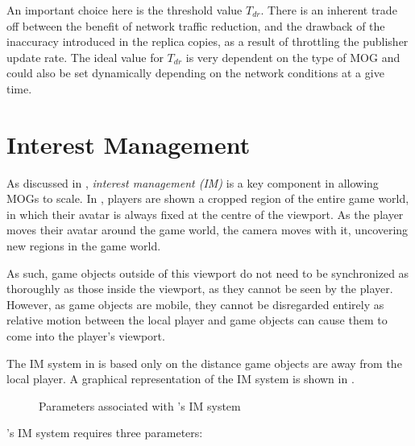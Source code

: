 An important choice here is the threshold value $T_{dr}$. There is an inherent trade off between the benefit of network traffic reduction, and the drawback of the inaccuracy introduced in the replica copies, as a result of throttling the publisher update rate. The ideal value for $T_{dr}$ is very dependent on the type of MOG and could also be set dynamically depending on the network conditions at a give time.


\section{Interest Management}\label{sec:des:im}
As discussed in , \textit{interest management (IM)} is a key component in allowing MOGs to scale. In \game{}, players are shown a cropped region of the entire game world, in which their avatar is always fixed at the centre of the viewport. As the player moves their avatar around the game world, the camera moves with it, uncovering new regions in the game world.

As such, game objects outside of this viewport do not need to be synchronized as thoroughly as those inside the viewport, as they cannot be seen by the player. However, as game objects are mobile, they cannot be disregarded entirely as relative motion between the local player and game objects can cause them to come into the player's viewport. 

The IM system in \game{} is based only on the distance game objects are away from the local player. A graphical representation of the IM system is shown in .

\begin{figure}[H]
    \centering
    \caption{Parameters associated with \game{}'s IM system}
    \label{fig:des:interest-regions}
\end{figure}

\game{}'s IM system requires three parameters:

